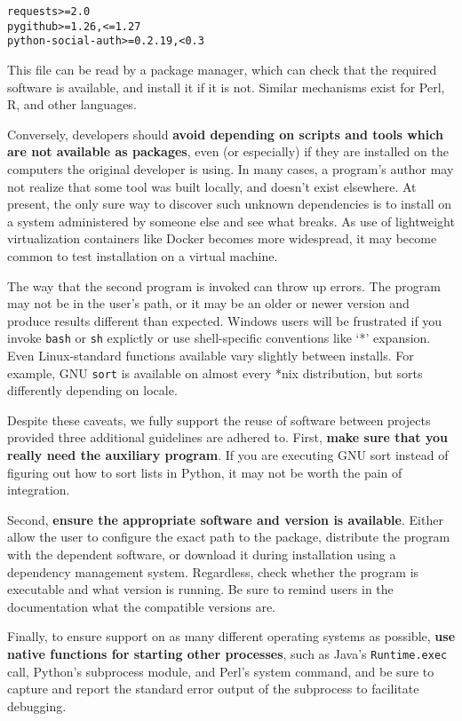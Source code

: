 \documentclass[10pt]{article}
\begin{document}
\begin{verbatim}
requests>=2.0
pygithub>=1.26,<=1.27
python-social-auth>=0.2.19,<0.3
\end{verbatim}

This file can be read by a package manager, which can check that the
required software is available, and install it if it is not. Similar
mechanisms exist for Perl, R, and other languages.

Conversely, developers should
\textbf{avoid depending on scripts and tools which are not available as packages},
even (or especially) if they are installed on the computers the original developer is using.
In many cases, a program's author may not realize that some tool was built locally, and
doesn't exist elsewhere. At present, the only sure way to discover such
unknown dependencies is to install on a system administered by someone
else and see what breaks. As use of lightweight
virtualization containers like Docker becomes more widespread, it may
become common to test installation on a virtual machine.

The way that the second program is invoked can throw up errors.
The program may not be in the user's path, or it may be an
older or newer version and produce results different than expected.
Windows users will be frustrated if you invoke \texttt{bash} or \texttt{sh} explictly or
use shell-specific conventions like `*' expansion.
Even Linux-standard functions available vary slightly between
installs. For example, GNU \texttt{sort} is available on almost every
*nix distribution, but sorts differently depending on locale.

Despite these caveats,
we fully support the reuse of software between projects provided
three additional guidelines are adhered to. First, 
\textbf{make sure that you really need the auxiliary program}. If you are
executing GNU sort instead of figuring out how to sort lists in Python,
it may not be worth the pain of integration.

Second, \textbf{ensure the appropriate software and version is available}.
Either allow the user to
configure the exact path to the package, distribute the program with the
dependent software, or download it during installation using a
dependency management system. Regardless, check whether the program is
executable and what version is running. Be sure to remind users in the
documentation what the compatible versions are.

Finally, to ensure support on as many different operating systems as
possible, \textbf{use native functions for starting other processes}, such as
Java's \texttt{Runtime.exec} call, Python's subprocess module, and Perl's system
command, and be sure to capture and report the standard error output of
the subprocess to facilitate debugging.
\end{document}
